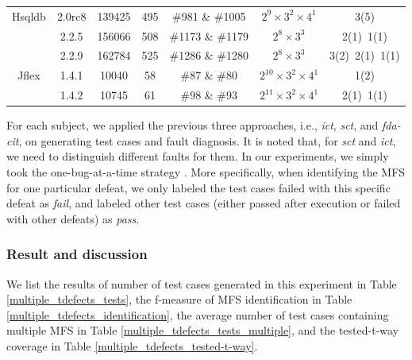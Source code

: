 \documentclass[10pt,journal,compsoc]{IEEEtran}
\begin{document}
{\begin{table}[ht]
\begin{tabular}{|c|c|c|c|c|c|c|}
Hsqldb& 2.0rc8 & 139425 & 495 &  \#981 \& \#1005 & $2^{9}\times 3^{2} \times 4^{1}$ & 3(5)\\
	  &2.2.5 & 156066 & 508 & \#1173 \&  \#1179 & $2^{8} \times 3^{3}$ & 2(1)\ 1(1)\\
	    &2.2.9 & 162784 &525 & \#1286 \& \#1280 & $2^{8} \times 3^{3}$ & 3(2)\ 2(1)\ 1(1)\\ \hline
Jflex& 1.4.1 &  10040 &58 & \#87 \& \#80  & $2^{10} \times 3^{2} \times 4^{1}$ & 1(2)\\
    &  1.4.2 &  10745 &61 &  \#98 \& \#93 & $2^{11} \times 3^{2} \times 4^{1}$ & 2(1)\ 1(1)\\ \hline
\end{tabular}
\end{table}

For each subject, we applied the previous three approaches, i.e., \emph{ict}, \emph{sct}, and \emph{fda-cit}, on generating test cases and fault diagnosis. It is noted that, for \emph{sct} and \emph{ict}, we need to distinguish different faults for them. In our experiments, we simply took the one-bug-at-a-time strategy \cite{wong2016survey}. More specifically, when identifying the MFS for one particular defeat, we only labeled the test cases failed with this specific defeat as \emph{fail}, and labeled other test cases (either passed after execution or failed with other defeats) as \emph{pass}.

\subsubsection{Result and discussion}

We list the results of number of test cases generated in this experiment in Table \ref{multiple_tdefects_tests}, the f-measure of MFS identification in Table \ref{multiple_tdefects_identification}, the average number of test cases containing multiple MFS in Table \ref{multiple_tdefects_tests_multiple}, and the tested-t-way coverage in Table \ref{multiple_tdefects_tested-t-way}.

}
\end{document}
